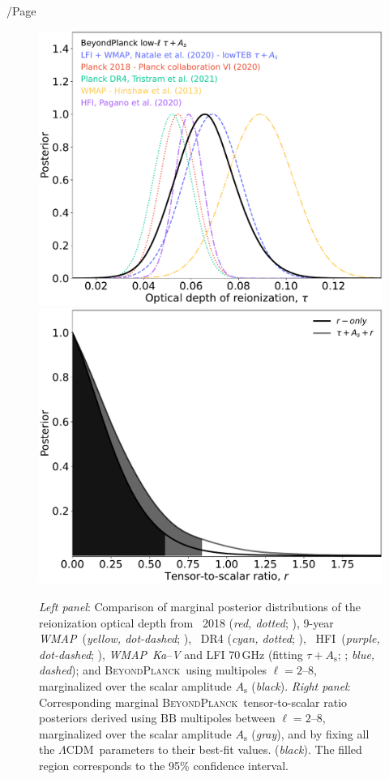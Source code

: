 /Page\documentclass[twocolumn]{aa}
\def\WMAP{\textit{WMAP}}
\def\LCDM{$\Lambda$CDM}
\newcommand{\BP}{\textsc{BeyondPlanck}}
\newcommand{\hfi}[0]{HFI}
\begin{document}
\begin{figure}[t]
  \center
  \includegraphics[width=0.49\linewidth]{figs/BP10_tau_post.pdf} 
  \includegraphics[width=0.49\linewidth]{figs/BP10_r_post.pdf}  
  \caption{\emph{Left panel}: Comparison of marginal posterior
    distributions of the reionization optical depth from \Planck\ 2018
    (\emph{red, dotted}; \citealp{planck2016-l06}), 9-year
    \WMAP\ (\emph{yellow, dot-dashed}; \citealp{hinshaw2012}),
    \Planck\ DR4 (\emph{cyan, dotted}; \citealp{tristram:2021}),
    \Planck\ \hfi\ (\emph{purple, dot-dashed}; \citealp{pagano:2020}),
    \WMAP\ \emph{Ka}--\emph V and LFI 70\,GHz (fitting $\tau +
    A_{\mathrm s}$; \citealp{natale:2020}; \emph{blue, dashed}); and
    \BP\ using multipoles $\ell=2$--8, marginalized over the scalar
    amplitude $A_{\mathrm s}$ (\emph{black}).  \emph{Right panel}:
    Corresponding marginal \BP\ tensor-to-scalar ratio posteriors
    derived using $\mathrm{BB}$ multipoles between $\ell=2$--8,
    marginalized over the scalar amplitude $A_{\mathrm s}$
    (\emph{gray}), and by fixing all the \LCDM\ parameters to their
    best-fit values. (\emph{black}). The filled region corresponds to
    the 95\% confidence interval.}
    \label{fig:tau}
\end{figure}
\end{document}
